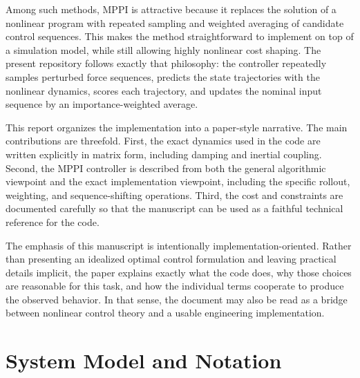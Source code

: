 \documentclass[conference]{IEEEtran}
\begin{document}
Among such methods, MPPI is attractive because it replaces the solution of a nonlinear program with repeated sampling and weighted averaging of candidate control sequences. This makes the method straightforward to implement on top of a simulation model, while still allowing highly nonlinear cost shaping. The present repository follows exactly that philosophy: the controller repeatedly samples perturbed force sequences, predicts the state trajectories with the nonlinear dynamics, scores each trajectory, and updates the nominal input sequence by an importance-weighted average.

This report organizes the implementation into a paper-style narrative. The main contributions are threefold. First, the exact dynamics used in the code are written explicitly in matrix form, including damping and inertial coupling. Second, the MPPI controller is described from both the general algorithmic viewpoint and the exact implementation viewpoint, including the specific rollout, weighting, and sequence-shifting operations. Third, the cost and constraints are documented carefully so that the manuscript can be used as a faithful technical reference for the code.

The emphasis of this manuscript is intentionally implementation-oriented. Rather than presenting an idealized optimal control formulation and leaving practical details implicit, the paper explains exactly what the code does, why those choices are reasonable for this task, and how the individual terms cooperate to produce the observed behavior. In that sense, the document may also be read as a bridge between nonlinear control theory and a usable engineering implementation.

\section{System Model and Notation}
\end{document}
